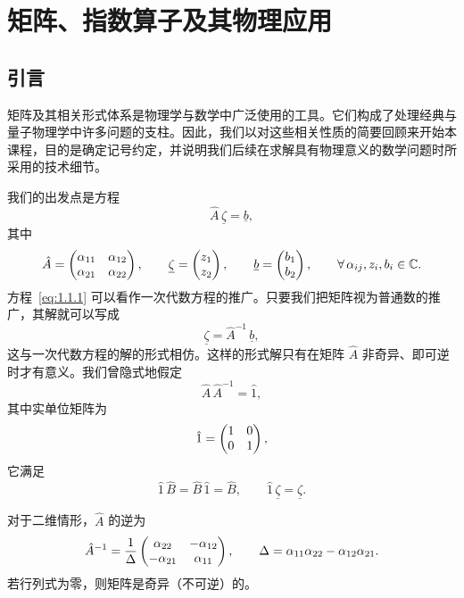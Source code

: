 
\chapter{矩阵、指数算子及其物理应用}
\label{ch:1}

\section{引言}
\label{sec:1.1}

矩阵及其相关形式体系是物理学与数学中广泛使用的工具。它们构成了处理经典与量子物理学中许多问题的支柱。因此，我们以对这些相关性质的简要回顾来开始本课程，目的是确定记号约定，并说明我们后续在求解具有物理意义的数学问题时所采用的技术细节。

我们的出发点是方程
\begin{equation}
\hat{A}\,\underline{\zeta} = \underline{b},
\label{eq:1.1.1}
\end{equation}
其中
\[
\hat{A} = \begin{pmatrix}\alpha_{11} & \alpha_{12} \\ \alpha_{21} & \alpha_{22}\end{pmatrix},\qquad
\underline{\zeta} = \begin{pmatrix}z_{1} \\ z_{2}\end{pmatrix},\qquad
\underline{b} = \begin{pmatrix}b_{1} \\ b_{2}\end{pmatrix},\qquad
\forall\,\alpha_{ij},z_{i},b_{i}\in\mathbb{C}.
\]
方程~\eqref{eq:1.1.1} 可以看作一次代数方程的推广。只要我们把矩阵视为普通数的推广，其解就可以写成
\begin{equation}
\underline{\zeta} = \hat{A}^{-1}\,\underline{b},
\label{eq:1.1.3}
\end{equation}
这与一次代数方程的解的形式相仿。这样的形式解只有在矩阵 $\hat{A}$ 非奇异、即可逆时才有意义。我们曾隐式地假定
\begin{equation}
\hat{A}\,\hat{A}^{-1} = \hat{1},
\label{eq:1.1.4}
\end{equation}
其中实单位矩阵为
\[
\hat{1} = \begin{pmatrix}1 & 0 \\ 0 & 1\end{pmatrix},
\]
它满足
\[
\hat{1}\,\hat{B} = \hat{B}\,\hat{1} = \hat{B},\qquad \hat{1}\,\underline{\zeta} = \underline{\zeta}.
\]

对于二维情形，$\hat{A}$ 的逆为
\[
\hat{A}^{-1} = \frac{1}{\Delta}\begin{pmatrix}\alpha_{22} & -\alpha_{12} \\ -\alpha_{21} & \alpha_{11}\end{pmatrix},\qquad
\Delta = \alpha_{11}\alpha_{22} - \alpha_{12}\alpha_{21}.
\]
若行列式为零，则矩阵是奇异（不可逆）的。

